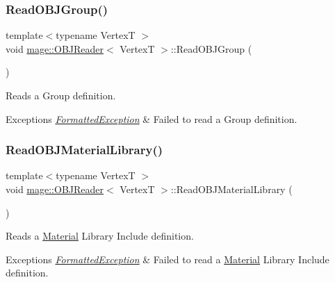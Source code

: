 \subsubsection{\texorpdfstring{Read\+O\+B\+J\+Group()}{ReadOBJGroup()}}
{\footnotesize\ttfamily template$<$typename VertexT $>$ \\
void \hyperlink{classmage_1_1_o_b_j_reader}{mage\+::\+O\+B\+J\+Reader}$<$ VertexT $>$\+::Read\+O\+B\+J\+Group (\begin{DoxyParamCaption}{ }\end{DoxyParamCaption})\hspace{0.3cm}{\ttfamily [private]}}

Reads a Group definition.


\begin{DoxyExceptions}{Exceptions}
{\em \hyperlink{classmage_1_1_formatted_exception}{Formatted\+Exception}} & Failed to read a Group definition. \\
\hline
\end{DoxyExceptions}
\hypertarget{classmage_1_1_o_b_j_reader_abc1f67436e50230bd2071b2dc31a4689}{}\label{classmage_1_1_o_b_j_reader_abc1f67436e50230bd2071b2dc31a4689} 
\subsubsection{\texorpdfstring{Read\+O\+B\+J\+Material\+Library()}{ReadOBJMaterialLibrary()}}
{\footnotesize\ttfamily template$<$typename VertexT $>$ \\
void \hyperlink{classmage_1_1_o_b_j_reader}{mage\+::\+O\+B\+J\+Reader}$<$ VertexT $>$\+::Read\+O\+B\+J\+Material\+Library (\begin{DoxyParamCaption}{ }\end{DoxyParamCaption})\hspace{0.3cm}{\ttfamily [private]}}

Reads a \hyperlink{classmage_1_1_material}{Material} Library Include definition.


\begin{DoxyExceptions}{Exceptions}
{\em \hyperlink{classmage_1_1_formatted_exception}{Formatted\+Exception}} & Failed to read a \hyperlink{classmage_1_1_material}{Material} Library Include definition. \\
\hline
\end{DoxyExceptions}
\hypertarget{classmage_1_1_o_b_j_reader_aa4c73ff0e5e3de40cacbebc189037802}{}\label{classmage_1_1_o_b_j_reader_aa4c73ff0e5e3de40cacbebc189037802} 
